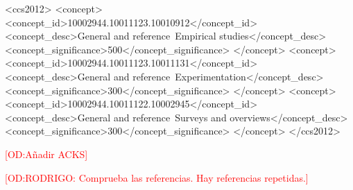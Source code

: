 \documentclass[acmtosem, screen, review]{acmart}
\newcommand{\odnote}[1]{\textcolor{red}{[OD:#1]}}
\begin{document}
\begin{CCSXML}
<ccs2012>
   <concept>
       <concept_id>10002944.10011123.10010912</concept_id>
       <concept_desc>General and reference~Empirical studies</concept_desc>
       <concept_significance>500</concept_significance>
       </concept>
   <concept>
       <concept_id>10002944.10011123.10011131</concept_id>
       <concept_desc>General and reference~Experimentation</concept_desc>
       <concept_significance>300</concept_significance>
       </concept>
   <concept>
       <concept_id>10002944.10011122.10002945</concept_id>
       <concept_desc>General and reference~Surveys and overviews</concept_desc>
       <concept_significance>300</concept_significance>
       </concept>
 </ccs2012>
\end{CCSXML}



\received[revised]{}
\received[accepted]{}

\maketitle





















\begin{acks}
  \odnote{A\~nadir ACKS}
\end{acks}



\odnote{RODRIGO: Comprueba las referencias. Hay referencias repetidas.}

\end{document}
